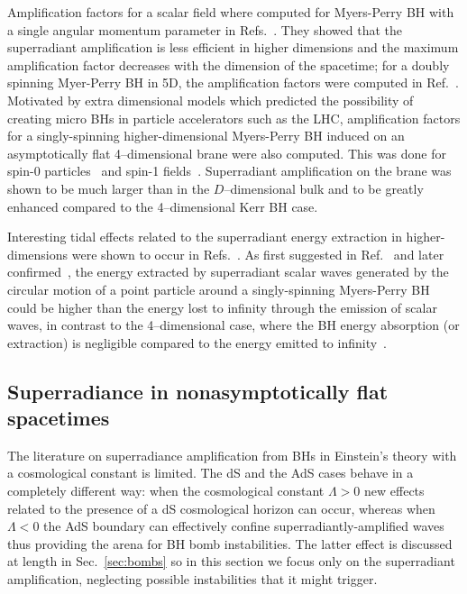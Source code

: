 \documentclass[11pt]{article}
\numberwithin{equation}{section} %
\begin{document}
Amplification factors for a scalar field where computed for Myers-Perry BH with a single angular momentum parameter in Refs.~\cite{Brito:2012gj,Creek:2007pw,Casals:2008pq}. They showed that the superradiant amplification is less efficient in higher dimensions and the maximum amplification factor decreases with the dimension of the spacetime; for a doubly spinning Myer-Perry BH in 5D, the amplification factors were computed in Ref.~\cite{Jung:2005pk}. 
Motivated by extra dimensional models which predicted the possibility of creating micro BHs in particle accelerators such as the LHC, amplification factors for a singly-spinning higher-dimensional Myers-Perry BH induced on an asymptotically flat 4--dimensional brane were also computed. This was done for spin-0 particles~\cite{Harris:2005jx,Ida:2005ax,Creek:2007sy} and spin-1 fields~\cite{Casals:2005sa}. Superradiant amplification on the brane was shown to be much larger than in the $D$--dimensional bulk and to be greatly enhanced compared to the 4--dimensional Kerr BH case. 

Interesting tidal effects related to the superradiant energy extraction in higher-dimensions were shown to occur in Refs.~\cite{Cardoso:2012zn,Brito:2012gw}. As first suggested in Ref.~\cite{Cardoso:2012zn} and later confirmed~\cite{Brito:2012gw}, the energy extracted by superradiant scalar waves generated by the circular motion of a point particle around a singly-spinning Myers-Perry BH could be higher than the energy lost to infinity through the emission of scalar waves, in contrast to the 4--dimensional case, where the BH energy absorption (or extraction) is negligible compared to the energy emitted to infinity~\cite{Poisson:1994yf}.


\subsection{Superradiance in nonasymptotically flat spacetimes}\label{sec:super_nonAF}
The literature on superradiance amplification from BHs in Einstein's theory with a cosmological constant is limited. The dS and the AdS cases behave in a completely different way: when the cosmological constant $\Lambda>0$ new effects related to the presence of a dS cosmological horizon can occur, whereas when $\Lambda<0$ the AdS boundary can effectively confine superradiantly-amplified waves thus providing the arena for BH bomb instabilities. The latter effect is discussed at length in Sec.~\ref{sec:bombs} so in this section we focus only on the superradiant amplification, neglecting possible instabilities that it might trigger.
\end{document}
